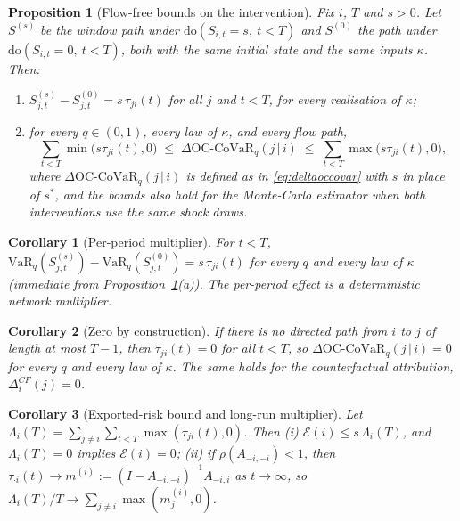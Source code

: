 \documentclass[referee,pdflatex,sn-mathphys-ay]{sn-jnl}
\theoremstyle{thmstyleone}%
\newtheorem{proposition}[theorem]{Proposition}%
\newtheorem{corollary}{Corollary}%
\theoremstyle{thmstyletwo}%
\theoremstyle{thmstylethree}%
\newcommand{\doop}{\mathrm{do}}
\newcommand{\VaR}{\mathrm{VaR}}
\newcommand{\OCCoVaR}{\text{OC-CoVaR}}
\begin{document}
\begin{proposition}[Flow-free bounds on the intervention]
\label{prop:A}
Fix $i$, $T$ and $s>0$. Let $S^{(s)}$ be the window path under
$\doop(S_{i,t}=s,\ t<T)$ and $S^{(0)}$ the path under $\doop(S_{i,t}=0,\ t<T)$, both
with the same initial state and the same inputs $\kappa$. Then:
\begin{enumerate}[label=(\alph*),leftmargin=*]
\item $S^{(s)}_{j,t}-S^{(0)}_{j,t}=s\,\tau_{ji}(t)$ for all $j$ and $t<T$, for every
realisation of $\kappa$;
\item for every $q\in(0,1)$, every law of $\kappa$, and every flow path,
\begin{equation}
\label{eq:bounds}
\sum_{t<T}\min\big(s\tau_{ji}(t),0\big)\;\le\;
\Delta\OCCoVaR_q(j\,|\,i)\;\le\;\sum_{t<T}\max\big(s\tau_{ji}(t),0\big),
\end{equation}
where $\Delta\OCCoVaR_q(j\,|\,i)$ is defined as in \eqref{eq:deltaoccovar} with $s$ in
place of $s^\ast$, and the bounds also hold for the Monte-Carlo estimator when both
interventions use the same shock draws.
\end{enumerate}
\end{proposition}

\begin{corollary}[Per-period multiplier]
\label{cor:pure}
For $t<T$, $\VaR_q(S^{(s)}_{j,t})-\VaR_q(S^{(0)}_{j,t})=s\,\tau_{ji}(t)$ for every
$q$ and every law of $\kappa$ (immediate from Proposition~\ref{prop:A}(a)). The per-period effect is a deterministic network
multiplier.
\end{corollary}

\begin{corollary}[Zero by construction]
\label{cor:zero}
If there is no directed path from $i$ to $j$ of length at most $T-1$, then
$\tau_{ji}(t)=0$ for all $t<T$, so $\Delta\OCCoVaR_q(j\,|\,i)=0$ for every $q$ and every
law of $\kappa$. The same holds for the counterfactual attribution, $\Delta_i^{CF}(j)=0$.
\end{corollary}

\begin{corollary}[Exported-risk bound and long-run multiplier]
\label{cor:bound}
Let $\Lambda_i(T)=\sum_{j\ne i}\sum_{t<T}\max(\tau_{ji}(t),0)$. Then
(i) $\mathcal{E}(i)\le s\,\Lambda_i(T)$, and $\Lambda_i(T)=0$ implies $\mathcal{E}(i)=0$;
(ii) if $\rho(A_{-i,-i})<1$, then $\tau_{\cdot i}(t)\to m^{(i)}:=(I-A_{-i,-i})^{-1}A_{-i,i}$
as $t\to\infty$, so $\Lambda_i(T)/T\to\sum_{j\ne i}\max(m^{(i)}_j,0)$.
\end{corollary}
\end{document}

